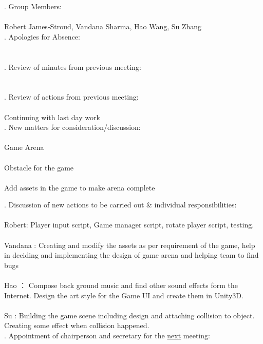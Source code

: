\documentclass{article}
\begin{document}
. Group Members: \\\\ \indent Robert James-Stroud, Vandana Sharma, Hao Wang, Su Zhang \\

. Apologies for Absence: \\\\ \indent   \\

. Review of minutes from previous meeting: \\\\ \indent  \\

. Review of actions from previous meeting: \\\\ \indent Continuing with last day work \\

. New matters for consideration/discussion: \\\\ \indent  Game Arena\\\\ \indent Obstacle for the game \\\\ \indent Add assets in the game to make arena complete 

. Discussion of new actions to be carried out \& individual responsibilities: \\\\ \indent Robert: Player input script, Game manager  script, rotate player script, testing. \\\\
\indent Vandana : Creating and modify the assets as per requirement of the game, help in deciding and implementing the design of game arena and helping team to find bugs \\\\
\indent Hao ： Compose back ground music and find other sound effects form the Internet. Design the art style for the Game UI and create them in Unity3D.\\\\
\indent Su : Building the game scene including design and attaching collision to object. Creating some effect when collision happened.\\

. Appointment of chairperson and secretary for the \underline{next} meeting: \\\\ \indent  \\
\end{document}
